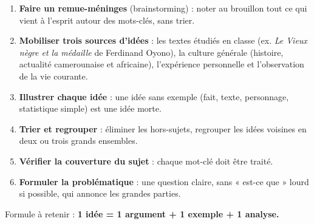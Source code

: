 \documentclass[11pt]{article}
\begin{document}
\begin{methode}
\begin{enumerate}
\item \textbf{Faire un remue-méninges} (brainstorming) : noter au brouillon tout ce qui vient à l'esprit autour des mots-clés, sans trier.
\item \textbf{Mobiliser trois sources d'idées} : les textes étudiés en classe (ex. \emph{Le Vieux nègre et la médaille} de Ferdinand Oyono), la culture générale (histoire, actualité camerounaise et africaine), l'expérience personnelle et l'observation de la vie courante.
\item \textbf{Illustrer chaque idée} : une idée sans exemple (fait, texte, personnage, statistique simple) est une idée morte.
\item \textbf{Trier et regrouper} : éliminer les hors-sujets, regrouper les idées voisines en deux ou trois grands ensembles.
\item \textbf{Vérifier la couverture du sujet} : chaque mot-clé doit être traité.
\item \textbf{Formuler la problématique} : une question claire, sans « est-ce que » lourd si possible, qui annonce les grandes parties.
\end{enumerate}
Formule à retenir : \textbf{1 idée = 1 argument + 1 exemple + 1 analyse.}
\end{methode}
\end{document}
